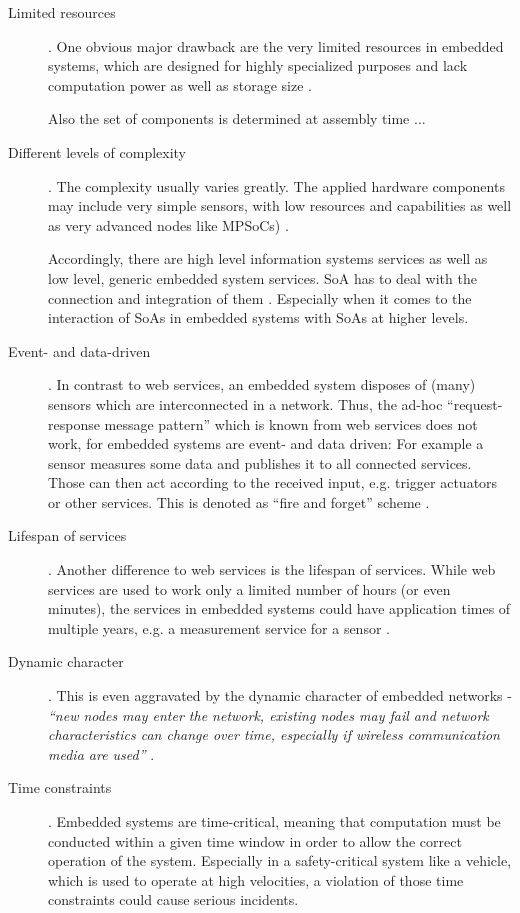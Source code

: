 \begin{description}
\item [Limited resources].
One obvious major drawback are the very limited resources in embedded systems, which are designed for highly specialized purposes and lack computation power as well as storage size \cite{rodrigues2011} \cite{scholz} \cite{sommer}.

Also the set of components is determined at assembly time ...

\item [Different levels of complexity].
The complexity usually varies greatly. The applied hardware components may include very simple sensors, with low resources and capabilities as well as very advanced nodes like MPSoCs) \cite{scholz} \cite{sommer}.

Accordingly, there are high level information systems services as well as low level, generic embedded system services. SoA has to deal with the connection and integration of them \cite{rodrigues2011}. Especially when it comes to the interaction of SoAs in embedded systems with SoAs at higher levels. 

\item [Event- and data-driven].
In contrast to web services, an embedded system disposes of (many) sensors which are interconnected in a network. Thus, the ad-hoc ``request-response message pattern'' which is known from web services does not work, for embedded systems are event- and data driven: For example a sensor measures some data and publishes it to all connected services. Those can then act according to the received input, e.g. trigger actuators or other services. This is denoted as ``fire and forget'' scheme \cite{sommer}.

\item [Lifespan of services].
Another difference to web services is the lifespan of services. While web services are used to work only a limited number of hours (or even minutes), the services in embedded systems could have application times of multiple years, e.g. a measurement service for a sensor \cite{buckl}.

\item [Dynamic character]. 
This is even aggravated by the dynamic character of embedded networks - \emph{``new nodes may enter the network, existing nodes may fail and network characteristics can change over time, especially if wireless communication media are used''} \cite{sommer}.

\item [Time constraints].
Embedded systems are time-critical, meaning that computation must be conducted within a given time window in order to allow the correct operation of the system. Especially in a safety-critical system like a vehicle, which is used to operate at high velocities, a violation of those time constraints could cause serious incidents.
\end{description}


